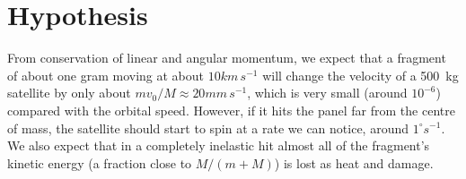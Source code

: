 \newpage
\section{Hypothesis}
\label{sec:hypothesis}

From conservation of linear and angular momentum, we expect that a
fragment of about one gram moving at about $10\unit{km\,s^{-1}}$ will change
the velocity of a 500~kg satellite by only about
$m v_0/M \approx 20\unit{mm\,s^{-1}}$, which is very small (around
$10^{-6}$) compared with the orbital speed. However, if it hits the panel
far from the centre of mass, the satellite should start to spin at a rate
we can notice, around $1^\circ\unit{s^{-1}}$. We also expect that in a
completely inelastic hit almost all of the fragment's kinetic energy
(a fraction close to $M/(m+M)$) is lost as heat and damage.
